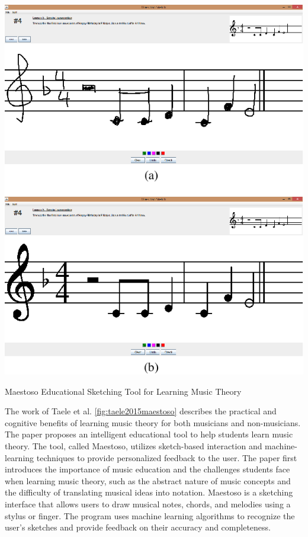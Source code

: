 \begin{marginfigure}
   \centering
   \includegraphics{images/maestoso.png}
   \caption{Maestoso Educational
   Sketching Tool for Learning Music Theory}
   \label{fig:taele2015maestoso}
\end{marginfigure}

The work of Taele et al. \cite{taele2015maestoso} \ref{fig:taele2015maestoso} describes the practical and cognitive benefits of learning music theory for both musicians and non-musicians. The paper proposes an intelligent educational tool to help students learn music theory. The tool, called Maestoso, utilizes sketch-based interaction and machine-learning techniques to provide personalized feedback to the user.
The paper first introduces the importance of music education and the challenges students face when learning music theory, such as the abstract nature of music concepts and the difficulty of translating musical ideas into notation.
Maestoso is a sketching interface that allows users to draw musical notes, chords, and melodies using a stylus or finger. The program uses machine learning algorithms to recognize the user's sketches and provide feedback on their accuracy and completeness.

